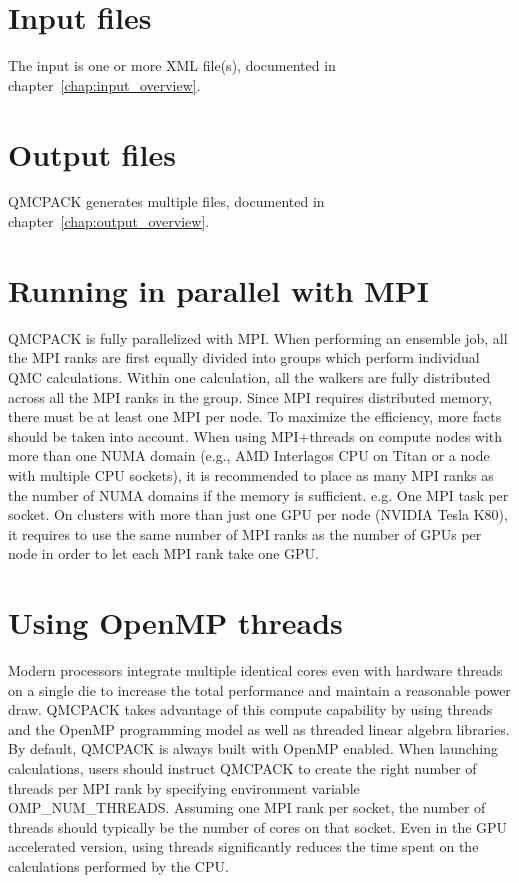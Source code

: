 \section{Input files}
\label{sec:inputs}
The input is one or more XML file(s), documented in chapter~\ref{chap:input_overview}.

\section{Output files}
QMCPACK generates multiple files, documented in chapter~\ref{chap:output_overview}.

\section{Running in parallel with MPI}
\label{sec:parallelrunning}

QMCPACK is fully parallelized with MPI. When performing an ensemble job, all
the MPI ranks are first equally divided into groups which perform individual
QMC calculations. Within one calculation, all the walkers are fully distributed
across all the MPI ranks in the group. Since MPI requires distributed memory,
there must be at least one MPI per node. To maximize the efficiency, more facts
should be taken into account. When using MPI+threads on compute nodes with more
than one NUMA domain (e.g., AMD Interlagos CPU on Titan or a node with multiple
CPU sockets), it is recommended to place as many MPI ranks as the number of
NUMA domains if the memory is sufficient. e.g. One MPI task per socket. On clusters with more than just one
GPU per node (NVIDIA Tesla K80), it requires to use the same number of MPI
ranks as the number of GPUs per node in order to let each MPI rank take one GPU.

\section{Using OpenMP threads}
\label{sec:openmprunning}
Modern processors integrate multiple identical cores even with
hardware threads on a single die to increase the total performance and
maintain a reasonable power draw. QMCPACK takes advantage of this
compute capability by using threads and the OpenMP programming model
as well as threaded linear algebra libraries. By default, QMCPACK is
always built with OpenMP enabled. When launching calculations, users
should instruct QMCPACK to create the right number of threads per MPI
rank by specifying environment variable OMP\_NUM\_THREADS. Assuming
one MPI rank per socket, the number of threads should typically be the
number of cores on that socket. Even in the GPU accelerated version,
using threads significantly reduces the time spent on the calculations
performed by the CPU.

